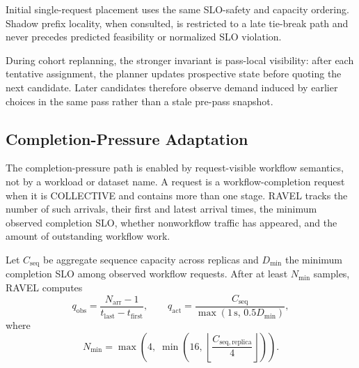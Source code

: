 Initial single-request placement uses the same SLO-safety and capacity
ordering.
Shadow prefix locality, when consulted, is restricted to a late tie-break path
and never precedes predicted feasibility or normalized SLO violation.

During cohort replanning, the stronger invariant is pass-local visibility:
after each tentative assignment, the planner updates prospective state before
quoting the next candidate.
Later candidates therefore observe demand induced by earlier choices in the
same pass rather than a stale pre-pass snapshot.


\subsection{Completion-Pressure Adaptation}
\label{sec:appendix:completion-pressure}

The completion-pressure path is enabled by request-visible workflow semantics,
not by a workload or dataset name.
A request is a workflow-completion request when it is COLLECTIVE and contains
more than one stage.
RAVEL tracks the number of such arrivals, their first and latest arrival
times, the minimum observed completion SLO, whether nonworkflow traffic has
appeared, and the amount of outstanding workflow work.

Let $C_{\mathrm{seq}}$ be aggregate sequence capacity across replicas and
$D_{\min}$ the minimum completion SLO among observed workflow requests.
After at least $N_{\min}$ samples, RAVEL computes
\begin{equation}
    q_{\mathrm{obs}}
    =
    \frac{N_{\mathrm{arr}}-1}
         {t_{\mathrm{last}}-t_{\mathrm{first}}},
    \qquad
    q_{\mathrm{act}}
    =
    \frac{C_{\mathrm{seq}}}
         {\max(1\,\mathrm{s},\,0.5D_{\min})},
    \label{eq:appendix:completion-pressure-qps}
\end{equation}
where
\begin{equation}
    N_{\min}
    =
    \max\!\left(
       4,\;
       \min\!\left(
          16,\,
          \left\lfloor
             \frac{C_{\mathrm{seq,replica}}}{4}
          \right\rfloor
       \right)
    \right).
    \label{eq:appendix:pressure-min-samples}
\end{equation}

